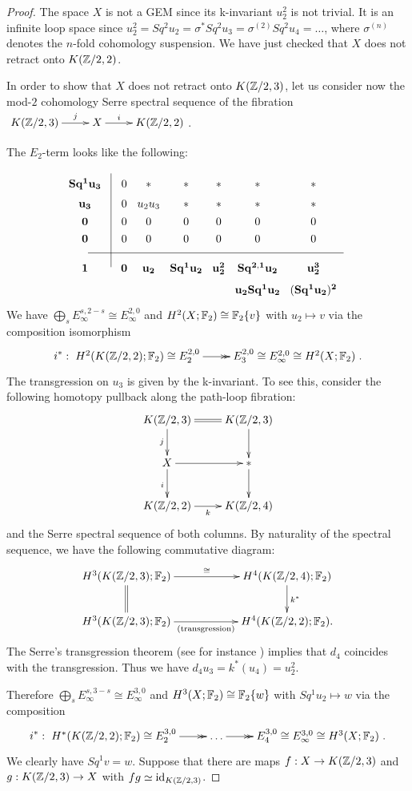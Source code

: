 \begin{proof}
The space $X$ is not a GEM since its k-invariant $u_2^2$ is not trivial. It is an infinite loop space since $u_2^2=Sq^2u_2=\sigma^*Sq^2u_3=\sigma^{(2)}Sq^2u_4=\dots$, where $\sigma^{(n)}$ denotes the $n$-fold cohomology suspension. We have just checked that $X$ does not retract onto $K(\mathbb{Z}/2,2)$.

In order to show that $X$ does not retract onto $K(\mathbb{Z}/2,3)$, let us consider now the mod-$2$ cohomology Serre spectral sequence of the fibration $\xymatrix{K(\Z/2,3)\ar[r]^-j &X\ar[r]^-i &K(\Z/2,2)}$. 

The $E_2$-term looks like the following:
$$\xymatrix@R=0.1cm@C=0.1cm{
&&\\
{\bf Sq^1u_3}  &&0 &{*} &{*} &{*} &{*} &{*}\\
{\bf u_3}  &&0 &u_2u_3&{*} &{*} &{*} &{*}\\
{\bf 0} &&0 &0 &0 &0 &0 &0\\
{\bf 0} &&0 &0 &0 &0 &0 &0\\ \ar@{-}[rrrrrrrr] &&&&&&&&\\
{\bf 1} &\ar@{-}[uuuuuu] &{\bf 0} &{\bf u_2} &{\bf Sq^1u_2} &{\bf u_2^2} &{\bf Sq^{2,1}u_2} &{\bf u_2^3}\\
&&&&&&{\bf u_2Sq^1u_2} &{\bf (Sq^1 u_2)^2}
}$$
We have $\bigoplus_{s}E_\infty^{s,2-s}\cong E_\infty^{2,0}$ and $H^2(X;\mathbb{F}_2)\cong\mathbb{F}_2\{v\}$ with $u_2\mapsto v$ via the composition isomorphism
$$
i^*:\xymatrix{H^2(K(\Z/2,2);\F_2)\cong E^{2,0}_2\ar@{->>}[r] &E^{2,0}_3\cong E^{2,0}_\infty\cong H^2(X;\F_2)}.
$$ 
The transgression on $u_3$ is given by the k-invariant. To see this, consider the following homotopy pullback along the path-loop fibration:
$$\xymatrix{
K(\Z/2,3)\ar[d]_j\ar@{=}[r] &K(\Z/2,3)\ar[d]\\
X\ar[d]_i\ar[r] &{*}\ar[d]\\
K(\Z/2,2)\ar[r]_-k &K(\Z/2,4)
}$$ and the Serre spectral sequence of both columns. By naturality of the spectral sequence, we have the following commutative diagram:
$$\xymatrix@C=2truecm{
H^3(K(\Z/2,3);\F_2)\ar@{=}[d]\ar[r]^-\cong &H^4(K(\Z/2,4);\F_2)\ar[d]^{k^*}\\
H^3(K(\Z/2,3);\F_2)\ar[r]_-{\text{(transgression)}} &H^4(K(\Z/2,2);\F_2).
}$$ The Serre's transgression theorem (see for instance \cite[Theorem 6.8, p. 189]{Mc00}) implies that $d_4$ coincides with the transgression. Thus we have $d_4u_3=k^*(u_4)=u_2^2$. 

Therefore $\bigoplus_{s}E_\infty^{s,3-s}\cong E_\infty^{3,0}$ and $H^3(X;\mathbb{F}_2)\cong\mathbb{F}_2\{w\}$ with $Sq^1u_2\mapsto w$ via the composition
$$
i^*:\xymatrix{H^*(K(\Z/2,2);\F_2)\cong E_2^{3,0}\ar@{->>}[r] &\dots\ar@{->>}[r] &E_4^{3,0}\cong E_\infty^{3,0}\cong H^3(X;\F_2)}.
$$ 
We clearly have $Sq^1v=w$.
Suppose that there are maps $f:X\to K(\mathbb{Z}/2,3)$ and $g:K(\mathbb{Z}/2,3)\to X$ with $fg\simeq \operatorname{id}_{K(\mathbb{Z}/2,3)}$. 


\end{proof}
